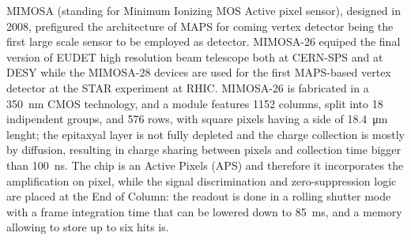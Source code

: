         MIMOSA \cite{MIMOSA}\cite{MIMOSA26} (standing for Minimum Ionizing MOS Active pixel sensor), designed in 2008, prefigured the architecture of MAPS for coming vertex detector being the first large scale sensor to be employed as detector. MIMOSA-26 equiped the final version of EUDET high resolution  beam telescope both at CERN-SPS and at DESY while the MIMOSA-28 devices are used for the first MAPS-based vertex detector at the STAR experiment at RHIC.
        MIMOSA-26 is fabricated in a \SI{350}{nm} CMOS technology, and a module features 1152 columns, split into 18 indipendent groups, and 576 rows, with square pixels having a side of \SI{18.4}{\um} lenght; the epitaxyal layer is not fully depleted and the charge collection is mostly by diffusion, resulting in charge sharing between pixels and collection time bigger than \SI{100}{ns}.
        The chip is an Active Pixels (APS) and therefore it incorporates the amplification on pixel, while the signal discrimination and zero-suppression logic are placed at the End of Column: the readout is done in a rolling shutter mode with a frame integration time that can be lowered down to \SI{85}{ms}, and a memory allowing to store up to six hits is. 

